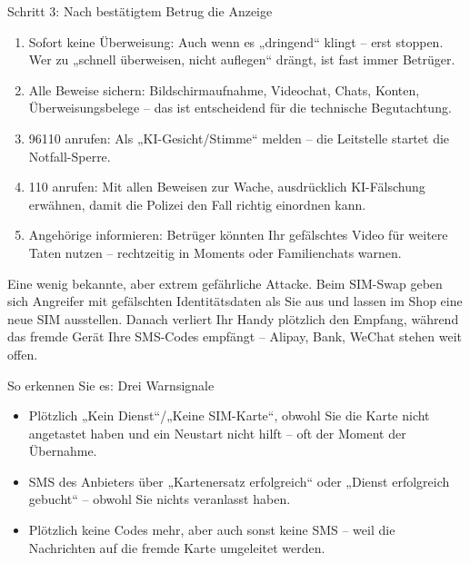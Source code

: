 \begin{tcbwarn}{Schritt 3: Nach bestätigtem Betrug die Anzeige}
\begin{enumerate}
  \item Sofort keine Überweisung: Auch wenn es „dringend“ klingt – erst stoppen. Wer zu „schnell überweisen, nicht auflegen“ drängt, ist fast immer Betrüger.
  \item Alle Beweise sichern: Bildschirmaufnahme, Videochat, Chats, Konten, Überweisungsbelege – das ist entscheidend für die technische Begutachtung.
  \item 96110 anrufen: Als „KI-Gesicht/Stimme“ melden – die Leitstelle startet die Notfall-Sperre.
  \item 110 anrufen: Mit allen Beweisen zur Wache, ausdrücklich KI-Fälschung erwähnen, damit die Polizei den Fall richtig einordnen kann.
  \item Angehörige informieren: Betrüger könnten Ihr gefälschtes Video für weitere Taten nutzen – rechtzeitig in Moments oder Familienchats warnen.
\end{enumerate}

\end{tcbwarn}


Eine wenig bekannte, aber extrem gefährliche Attacke. Beim SIM-Swap geben sich Angreifer mit gefälschten Identitätsdaten als Sie aus und lassen im Shop eine neue SIM ausstellen. Danach verliert Ihr Handy plötzlich den Empfang, während das fremde Gerät Ihre SMS-Codes empfängt – Alipay, Bank, WeChat stehen weit offen.

\begin{tcbinfo}{So erkennen Sie es: Drei Warnsignale}
\begin{itemize}
  \item Plötzlich „Kein Dienst“/„Keine SIM-Karte“, obwohl Sie die Karte nicht angetastet haben und ein Neustart nicht hilft – oft der Moment der Übernahme.
  \item SMS des Anbieters über „Kartenersatz erfolgreich“ oder „Dienst erfolgreich gebucht“ – obwohl Sie nichts veranlasst haben.
  \item Plötzlich keine Codes mehr, aber auch sonst keine SMS – weil die Nachrichten auf die fremde Karte umgeleitet werden.
\end{itemize}

\end{tcbinfo}

